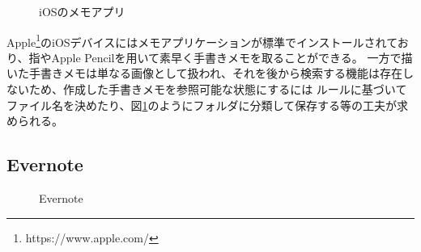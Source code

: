 \begin{figure}[htbp]
    \begin{center}
         \end{center}
    \caption{iOSのメモアプリ} \label{fig:iosmemo}
\end{figure}

Apple\footnote{https://www.apple.com/}のiOSデバイスにはメモアプリケーションが標準でインストールされており、指やApple Pencilを用いて素早く手書きメモを取ることができる。
一方で描いた手書きメモは単なる画像として扱われ、それを後から検索する機能は存在しないため、作成した手書きメモを参照可能な状態にするには
ルールに基づいてファイル名を決めたり、図\ref{fig:iosmemo}のようにフォルダに分類して保存する等の工夫が求められる。

\subsection{Evernote}

\begin{figure}[htbp]
    \begin{center}
         \end{center}
    \caption{Evernote} \label{evernote} \label{fig:evernote}
\end{figure}


